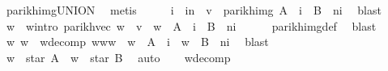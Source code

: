 \begin{isabellebody}
\ parikh{\isacharunderscore}{\kern0pt}img{\isacharunderscore}{\kern0pt}UNION\ \isamarkupfalse%
\ metis\isanewline
\ \ \isamarkupfalse%
\ \isamarkupfalse%
\ i\ \ {\isachardoublequoteopen}i{\isasymle}n\ {\isasymand}\ v\ {\isasymin}\ parikh{\isacharunderscore}{\kern0pt}img\ {\isacharparenleft}{\kern0pt}A\ {\isacharcircum}{\kern0pt}{\isacharcircum}{\kern0pt}\ i\ {\isacharat}{\kern0pt}{\isacharat}{\kern0pt}\ B\ {\isacharcircum}{\kern0pt}{\isacharcircum}{\kern0pt}\ {\isacharparenleft}{\kern0pt}n{\isacharminus}{\kern0pt}i{\isacharparenright}{\kern0pt}{\isacharparenright}{\kern0pt}{\isachardoublequoteclose}\ \isamarkupfalse%
\ blast\isanewline
\ \ \isamarkupfalse%
\ \isamarkupfalse%
\ w\ \ w{\isacharunderscore}{\kern0pt}intro{\isacharcolon}{\kern0pt}\ {\isachardoublequoteopen}parikh{\isacharunderscore}{\kern0pt}vec\ w\ {\isacharequal}{\kern0pt}\ v\ {\isasymand}\ w\ {\isasymin}\ A\ {\isacharcircum}{\kern0pt}{\isacharcircum}{\kern0pt}\ i\ {\isacharat}{\kern0pt}{\isacharat}{\kern0pt}\ B\ {\isacharcircum}{\kern0pt}{\isacharcircum}{\kern0pt}\ {\isacharparenleft}{\kern0pt}n{\isacharminus}{\kern0pt}i{\isacharparenright}{\kern0pt}{\isachardoublequoteclose}\isanewline
\ \ \ \ \isamarkupfalse%
\ parikh{\isacharunderscore}{\kern0pt}img{\isacharunderscore}{\kern0pt}def\ \isamarkupfalse%
\ blast\isanewline
\ \ \isamarkupfalse%
\ \isamarkupfalse%
\ w{}\ w{}\ \ w{\isacharunderscore}{\kern0pt}decomp{\isacharcolon}{\kern0pt}\ {\isachardoublequoteopen}w{\isacharequal}{\kern0pt}w{}{\isacharat}{\kern0pt}w{}\ {\isasymand}\ w{}\ {\isasymin}\ A\ {\isacharcircum}{\kern0pt}{\isacharcircum}{\kern0pt}\ i\ {\isasymand}\ w{}\ {\isasymin}\ B\ {\isacharcircum}{\kern0pt}{\isacharcircum}{\kern0pt}\ {\isacharparenleft}{\kern0pt}n{\isacharminus}{\kern0pt}i{\isacharparenright}{\kern0pt}{\isachardoublequoteclose}\ \isamarkupfalse%
\ blast\isanewline
\ \ \isamarkupfalse%
\ \isamarkupfalse%
\ {\isachardoublequoteopen}w{}\ {\isasymin}\ star\ A{\isachardoublequoteclose}\ \ {\isachardoublequoteopen}w{}\ {\isasymin}\ star\ B{\isachardoublequoteclose}\ \isamarkupfalse%
\ auto\isanewline
\ \ \isamarkupfalse%
\ w{\isacharunderscore}{\kern0pt}decomp\ \isamarkupfalse%

\end{isabellebody}
